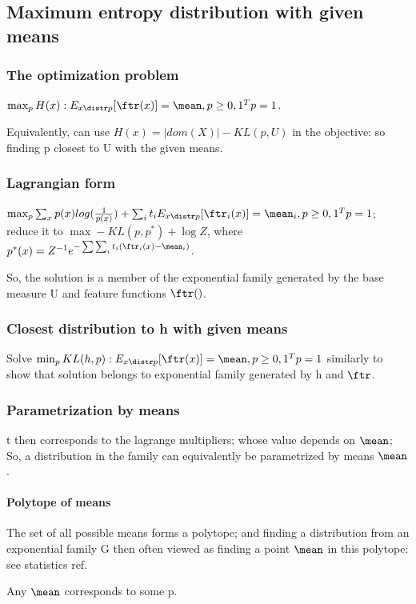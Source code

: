 \documentclass[oneside, article]{memoir}
\begin{document}
\subsection{Maximum entropy distribution with given means}
\subsubsection{The optimization problem}
$\max_p H(x): E_{x \distr p}[\ftr(x)] = \mean, p \geq 0, 1^{T}p = 1$.

Equivalently, can use $H(x) = |dom(X)| - KL(p, U)$ in the objective: so finding p closest to U with the given means.

\subsubsection{Lagrangian form}
$\max_p \sum_x p(x)log(\frac{1}{p(x)}) + \sum_i t_i E_{x \distr p}[\ftr_i(x)] = \mean_i, p \geq 0, 1^{T}p = 1$; reduce it to $\max - KL(p, p^{*}) + \log Z$, where $p^{*}(x) = Z^{-1}e^{-\sum \sum_{i}t_{i}(\ftr_i(x) - \mean_i)}$.

So, the solution is a member of the exponential family generated by the base measure U and feature functions $\ftr()$.

\subsubsection{Closest distribution to h with given means}
Solve $\min_p KL(h, p): E_{x \distr p}[\ftr(x)] = \mean, p \geq 0, 1^{T}p = 1$ similarly to show that solution belongs to exponential family generated by h and $\ftr$.

\subsubsection{Parametrization by means}
t then corresponds to the lagrange multipliers; whose value depends on $\mean$; So, a distribution in the family can equivalently be parametrized by means $\mean$.

\paragraph*{Polytope of means}
The set of all possible means forms a polytope; and finding a distribution from an exponential family G then often viewed as finding a point $\mean$ in this polytope: see statistics ref.

Any $\mean$ corresponds to some p.
\end{document}
